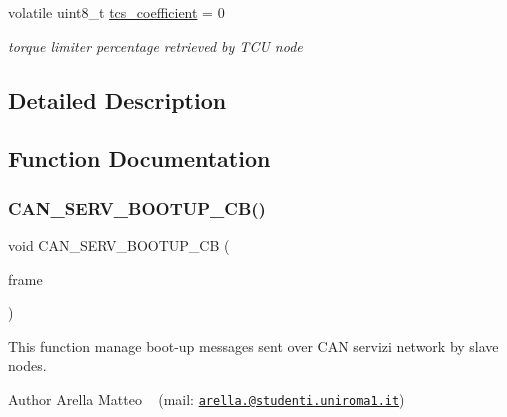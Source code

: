 \begin{DoxyCompactItemize}
\mbox{\label{group___c_a_n__servizi__group_gac6f04deffa2553115dad7c8b45e14d8b}} 
volatile uint8\+\_\+t \mbox{\hyperlink{group___c_a_n__servizi__group_gac6f04deffa2553115dad7c8b45e14d8b}{tcs\+\_\+coefficient}} = 0
\begin{DoxyCompactList}\small\item\em torque limiter percentage retrieved by T\+CU node \end{DoxyCompactList}\end{DoxyCompactItemize}


\subsection{Detailed Description}


\subsection{Function Documentation}
\mbox{\label{group___c_a_n__servizi__group_gaab9a1dbabaf97e474f5597e8b2a02c6e}} 
\subsubsection{\texorpdfstring{C\+A\+N\+\_\+\+S\+E\+R\+V\+\_\+\+B\+O\+O\+T\+U\+P\+\_\+\+C\+B()}{CAN\_SERV\_BOOTUP\_CB()}}
{\footnotesize\ttfamily void C\+A\+N\+\_\+\+S\+E\+R\+V\+\_\+\+B\+O\+O\+T\+U\+P\+\_\+\+CB (\begin{DoxyParamCaption}\item[{C\+A\+N\+\_\+\+F\+R\+A\+ME $\ast$}]{frame }\end{DoxyParamCaption})}



This function manage boot-\/up messages sent over C\+AN servizi network by slave nodes. 

\begin{DoxyAuthor}{Author}
Arella Matteo ~\newline
 (mail\+: \href{mailto:arella.1646983@studenti.uniroma1.it}{\tt arella.@studenti.\+uniroma1.\+it})
\end{DoxyAuthor}

